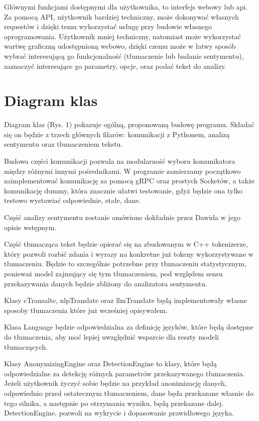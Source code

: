 \documentclass{article}
\begin{document}
Głównymi funkcjami dostępnymi dla użytkownika, to interfejs webowy lub api. 
Za pomocą API, użytkownik bardziej techniczny, może dokonywać własnych requestów i dzięki temu wykorzystać usługę przy budowie własnego oprogramowania. Użytkownik mniej techniczny, natomiast może wykorzystać wartwę graficzną udostępnioną webowo, dzięki czemu może w łatwy sposób wybrać interesującą go funkcjonalność (tłumaczenie lub badanie sentymentu), zaznaczyć interesujące go parametry, opcje, oraz podać tekst do analizy.

\section{Diagram klas}

Diagram klas (Rys. 1) pokazuje ogólną, proponowaną budowę programu. Składać się on będzie z trzech głównych filarów: komunikacji z Pythonem, analizą sentymentu oraz tłumaczeniem tekstu. 

Budowa części komunikacji pozwala na modularność wyboru komunikatora między różnymi innymi pośrednikami. W programie zamierzamy początkowo zaimplementować komunikację za pomocą gRPC oraz prostych Socketów, a także komunikację dummy, która znacznie ułatwi testowanie, gdyż będzie ona tylko testowo wystawiać odpowiednie, stałe, dane. 

Część analizy sentymentu zostanie omówione dokładnie przez Dawida w jego opisie wstępnym. 

Część tłumacząca tekst będzie opierać się na zbudowanym w C++ tokenizerze, który pozwoli rozbić zdania i wyrazy na konkretne już tokeny wykorzystywane w tłumaczeniu. Będzie to szczególnie potrzebne przy tłumaczeniu statystycznym, ponieważ model zajmujący się tym tłumaczeniem, pod względem sensu przekazywania danych będzie zbliżony do analizatora sentymentu. 

Klasy cTransalte, nlpTranslate oraz llmTranslate będą implementowały własne sposoby tłumaczenia które już wcześniej opisywałem. 

Klasa Language będzie odpowiedzialna za definicję języków, które będą dostępne do tłumaczenia, aby moć lepiej uwzględnić wsparcie dla reszty modeli tłumaczących. 

Klasy AnonymizingEngine oraz DetectionEngine to klasy, które będą odpowiedzialne za detekcję różnych parametrów przekazywanego tłumaczenia. Jeżeli użytkownik życzyć sobie będzie na przykład anonimizację danych, odpowiednio przed ostatecznym tłumaczeniem, dane będa przekazane własnie do tego silnika, a następnie po otrzymania wyniku, będą przekazane dalej. DetectionEngine, pozwoli na wykrycie i dopasowanie prawidłowego języka.
\end{document}

